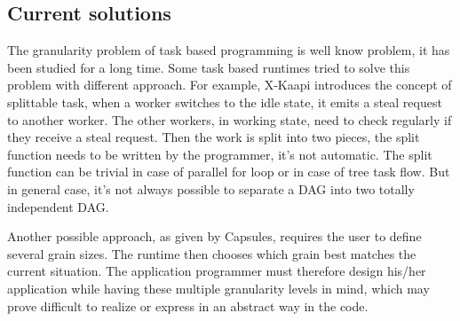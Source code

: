 \subsection{Current solutions}
The granularity problem of task based programming is well know problem, it has been studied for a long time.
%
Some task based runtimes tried to solve this problem with different approach.
%
For example, X-Kaapi introduces the concept of splittable task, when a worker switches to the idle state, it emits a steal request to another worker.
%
The other workers, in working state, need to check regularly if they receive a steal request.
%
Then the work is split into two pieces, the split function needs to be written by the programmer, it's not automatic.
%
The split function can be trivial in case of parallel for loop or in case of tree task flow.
%
But in general case, it's not always possible to separate a DAG into two totally independent DAG.


Another possible approach, as given by Capsules\cite{capsules}, requires the user to define several grain sizes.
%
The runtime then chooses which grain best matches the current situation.
%
The application programmer must therefore design his/her application while having these multiple granularity levels in mind, which may prove difficult to realize or express in an abstract way in the code.
